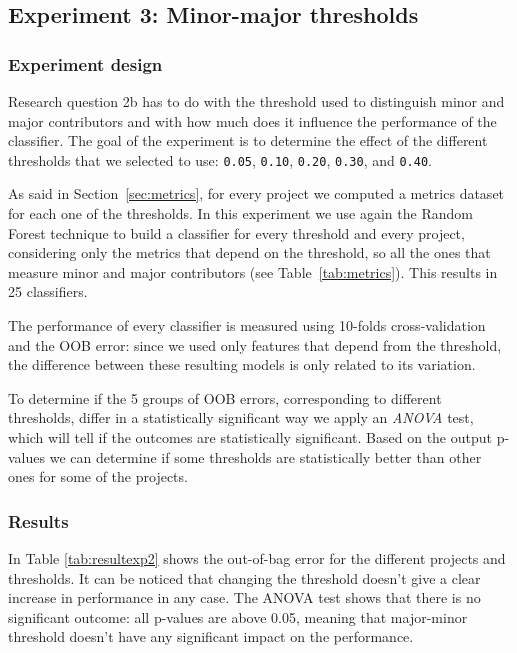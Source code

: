 \subsection{Experiment 3: Minor-major thresholds}

\subsubsection{Experiment design}

Research question 2b has to do with the threshold used to distinguish minor and major contributors and with how much does it influence the performance of the classifier. The goal of the experiment is to determine the effect of the different thresholds that we selected to use: \texttt{0.05}, \texttt{0.10}, \texttt{0.20}, \texttt{0.30}, and \texttt{0.40}.

As said in Section~\ref{sec:metrics}, for every project we computed a metrics dataset for each one of the thresholds. In this experiment we use again the Random Forest technique to build a classifier for every threshold and every project, considering only the metrics that depend on the threshold, so all the ones that measure minor and major contributors (see Table~\ref{tab:metrics}). This results in 25 classifiers.

The performance of every classifier is measured using 10-folds cross-validation and the OOB error: since we used only features that depend from the threshold, the difference between these resulting models is only related to its variation.

To determine if the 5 groups of OOB errors, corresponding to different thresholds, differ in a statistically significant way we apply an \textit{ANOVA} test, which will tell if the outcomes are statistically significant. Based on the output p-values we can determine if some thresholds are statistically better than other ones for some of the projects.


\subsubsection{Results}

In Table \ref{tab:resultexp2} shows the out-of-bag error for the different projects and thresholds. It can be noticed that changing the threshold doesn't give a clear increase in performance in any case. The ANOVA test shows that there is no significant outcome: all p-values are above 0.05, meaning that major-minor threshold doesn't have any significant impact on the performance.


